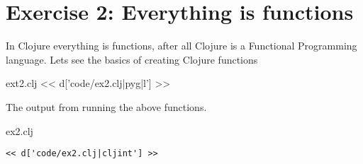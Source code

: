 \chapter{Exercise 2: Everything is functions}

In Clojure everything is functions, after all Clojure is a Functional Programming language. Lets see the basics of creating Clojure functions

\begin{code}{ext2.clj}
<< d['code/ex2.clj|pyg|l'] >>
\end{code}


The output from running the above functions.

\begin{code}{ex2.clj}
\begin{Verbatim}
<< d['code/ex2.clj|cljint'] >>
\end{Verbatim}
\end{code}
